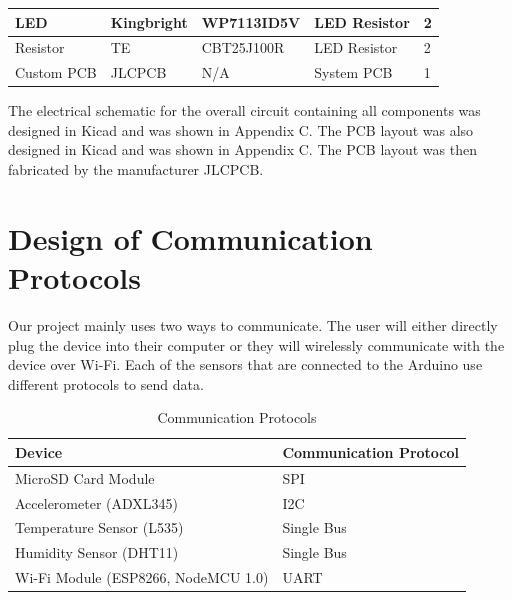 \documentclass[12pt, titlepage]{article}
\begin{document}
\begin{table}[H]
\begin{tabular}{|p{3cm}|p{2cm}|p{4cm}|p{4cm}|p{2cm}|}
  LED                                
  & Kingbright
  & WP7113ID5V
  & LED Resistor
  & 2
  \newline                            
  \\ \hline

  Resistor                                
  & TE
  & CBT25J100R
  & LED Resistor
  & 2
  \newline                            
  \\ \hline

  Custom PCB                                
  & JLCPCB
  & N/A
  & System PCB
  & 1
  \newline                            
  \\ \hline

  \end{tabular}
\end{table}

The electrical schematic for the overall circuit containing all components was designed in Kicad and was shown in Appendix C. The PCB layout was also designed in Kicad and was shown in Appendix C. The PCB layout was then fabricated by the manufacturer JLCPCB. \\

\newpage





\newpage
\section{Design of Communication Protocols}
Our project mainly uses two ways to communicate. The user will either directly plug the device into their computer or they will wirelessly communicate with the device over Wi-Fi. Each of the sensors that are connected to the Arduino use different protocols to send data.


\begin{table}[!h]
\begin{tabular}{| p{} | p{}|}
  \hline
  \rowcolor[gray]{0.9}
  Device & Communication Protocol \\
  \hline
  MicroSD Card Module & SPI\\
  \hline
  Accelerometer (ADXL345) &  I2C\\
  \hline
  Temperature Sensor (L535) & Single Bus \\
  \hline
  Humidity Sensor (DHT11) & Single Bus \\
  \hline
  Wi-Fi Module (ESP8266, NodeMCU 1.0) & UART \\
  \hline
 
\end{tabular}
\caption{Communication Protocols}
\end{table}
\end{document}
